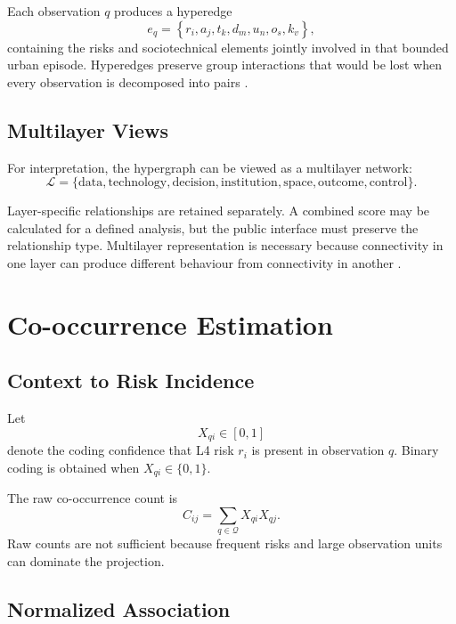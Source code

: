 \documentclass[11pt,a4paper]{article}
\begin{document}
Each observation $q$ produces a hyperedge
\begin{equation}
e_q =
\left\{
r_i,a_j,t_k,d_m,u_n,o_s,k_v
\right\},
\end{equation}
containing the risks and sociotechnical elements jointly involved in that bounded urban episode. Hyperedges preserve group interactions that would be lost when every observation is decomposed into pairs \cite{battiston2020}.

\subsection{Multilayer Views}

For interpretation, the hypergraph can be viewed as a multilayer network:
\begin{equation}
\mathcal{L} =
\{
\text{data},
\text{technology},
\text{decision},
\text{institution},
\text{space},
\text{outcome},
\text{control}
\}.
\end{equation}

Layer-specific relationships are retained separately. A combined score may be calculated for a defined analysis, but the public interface must preserve the relationship type. Multilayer representation is necessary because connectivity in one layer can produce different behaviour from connectivity in another \cite{kivela2014,boccaletti2014}.

\section{Co-occurrence Estimation}

\subsection{Context to Risk Incidence}

Let
\begin{equation}
X_{qi} \in [0,1]
\end{equation}
denote the coding confidence that L4 risk $r_i$ is present in observation $q$. Binary coding is obtained when $X_{qi}\in\{0,1\}$.

The raw co-occurrence count is
\begin{equation}
C_{ij} =
\sum_{q \in \mathcal{Q}}
X_{qi}X_{qj}.
\end{equation}
Raw counts are not sufficient because frequent risks and large observation units can dominate the projection.

\subsection{Normalized Association}
\end{document}
